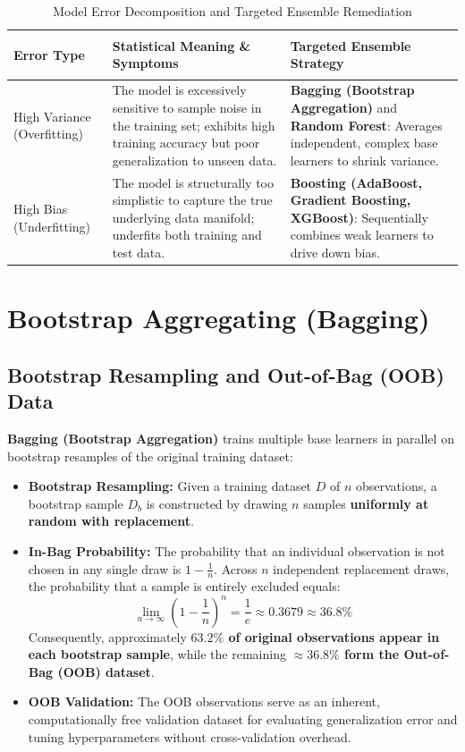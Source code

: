 \begin{table}[htbp]
\centering
\caption{Model Error Decomposition and Targeted Ensemble Remediation}
\label{tab:ensemble_error_decomp}
\vspace{0.2em}
\renewcommand{\arraystretch}{1.3}
\begin{tabularx}{\textwidth}{>{\bfseries\raggedright\arraybackslash}p{3.0cm}XX}
\toprule
Error Type & Statistical Meaning \& Symptoms & Targeted Ensemble Strategy \\
\midrule
High Variance (Overfitting) & The model is excessively sensitive to sample noise in the training set; exhibits high training accuracy but poor generalization to unseen data. & \textbf{Bagging (Bootstrap Aggregation)} and \textbf{Random Forest}: Averages independent, complex base learners to shrink variance. \\
High Bias (Underfitting) & The model is structurally too simplistic to capture the true underlying data manifold; underfits both training and test data. & \textbf{Boosting (AdaBoost, Gradient Boosting, XGBoost)}: Sequentially combines weak learners to drive down bias. \\
\bottomrule
\end{tabularx}
\end{table}

\section{Bootstrap Aggregating (Bagging)}

\subsection{Bootstrap Resampling and Out-of-Bag (OOB) Data}
\textbf{Bagging (Bootstrap Aggregation)} trains multiple base learners in parallel on bootstrap resamples of the original training dataset:
\begin{itemize}
    \item \textbf{Bootstrap Resampling:} Given a training dataset $D$ of $n$ observations, a bootstrap sample $D_b$ is constructed by drawing $n$ samples \textbf{uniformly at random with replacement}.
    \item \textbf{In-Bag Probability:} The probability that an individual observation is not chosen in any single draw is $1 - \frac{1}{n}$. Across $n$ independent replacement draws, the probability that a sample is entirely excluded equals:
    \begin{equation}
        \lim_{n \to \infty} \left(1 - \frac{1}{n}\right)^n = \frac{1}{e} \approx 0.3679 \approx 36.8\%
    \end{equation}
    Consequently, approximately \textbf{$63.2\%$ of original observations appear in each bootstrap sample}, while the remaining \textbf{$\approx 36.8\%$ form the Out-of-Bag (OOB) dataset}.
    \item \textbf{OOB Validation:} The OOB observations serve as an inherent, computationally free validation dataset for evaluating generalization error and tuning hyperparameters without cross-validation overhead.
\end{itemize}

